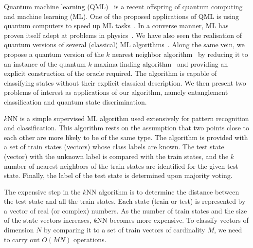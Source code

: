 \documentclass[a4paper,twocolumn,11pt,unpublished]{quantumarticle}
\begin{document}
Quantum machine learning (QML)~\cite{Biamonte2017, Wittek2014, Schuld2014, Arunachalam2017} is a recent offspring of quantum computing and machine learning (ML). One of the proposed applications of QML is using quantum computers to speed up ML tasks~\cite{Harrow2009, Wiebe2012}. In a converse manner, ML has proven itself adept at problems in physics~\cite{Carrasquilla2017, Wang2017, Lu2018, Carleo2019}. We have also seen the realisation of quantum versions of several (classical) ML algorithms~\cite{Lloyd2014, Rebentrost2014, Lloyd2013}. Along the same vein, we propose a quantum version of the $k$ nearest neighbor algorithm~\cite{Cover1967} by reducing it to an instance of the quantum $k$ maxima finding algorithm~\cite{Durr2006, Miyamoto2019} and providing an explicit construction of the oracle required. The algorithm is capable of classifying states without their explicit classical description. We then present two problems of interest as applications of our algorithm, namely entanglement classification and quantum state discrimination. 


$k$NN is a simple supervised ML algorithm used extensively for pattern recognition and classification. This algorithm rests on the assumption that two points close to each other are more likely to be of the same type. The algorithm is provided with a set of train states (vectors) whose class labels are known. The test state (vector) with the unknown label is compared with the train states, and the $k$ number of nearest neighbors of the train states are identified for the given test state. Finally, the label of the test state is determined upon majority voting.

The expensive step in the $k$NN algorithm is to determine the distance between the test state and all the train states. Each state (train or test) is represented by a vector of real (or complex) numbers. As the number of train states and the size of the state vectors increases, $k$NN becomes more expensive. To classify vectors of dimension $N$ by comparing it to a set of train vectors of cardinality $M$, we need to carry out $O(MN)$ operations.
\end{document}

